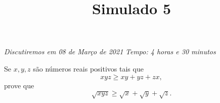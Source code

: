 \documentclass[12pt,a4paper]{article}
\title{Simulado 5}
\author{\vspace{1.3ex}}
\begin{document}
	
	\zeustitle

	\textit{Discutiremos em 08 de Março de 2021} \hfill \textit{Tempo: 4 horas e 30 minutos}

	\vspace{1em}

	\begin{prob}
		Se $x, y, z$ são números reais positivos tais que \[xyz \geq xy + yz + zx,\] prove que \[\sqrt{xyz} \geq \sqrt x + \sqrt y + \sqrt z.\]
	\end{prob}

\end{document}
